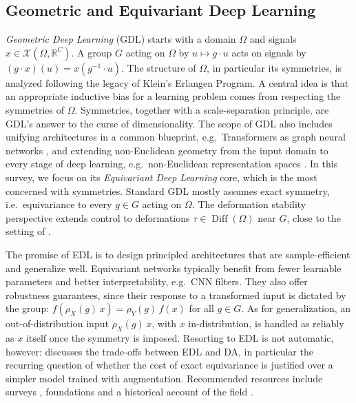 \documentclass[mathematics,review,submit,moreauthors]{Definitions/mdpi}
\begin{document}
\subsection{Geometric and Equivariant Deep Learning}\label{sec:gdl}
\emph{Geometric Deep Learning} (GDL) \citep{bronstein2017ispm,bronstein2021} starts with a domain $\Omega$ and signals $x\in\mathcal{X}(\Omega,\mathbb{R}^C)$. A group $G$ acting on $\Omega$ by $u\mapsto g\cdot u$ acts on signals by $(g\cdot x)(u)=x(g^{-1}\cdot u)$.
The structure of $\Omega$, in particular its symmetries, is analyzed following the legacy of Klein's Erlangen Program.
A central idea is that an appropriate inductive bias for a learning problem comes from respecting the symmetries of $\Omega$.
Symmetries, together with a scale-separation principle, are GDL's answer to the curse of dimensionality.
The scope of GDL also includes unifying architectures in a common blueprint, e.g.\ Transformers as graph neural networks \citep{joshi2025}, and extending non-Euclidean geometry from the input domain to every stage of deep learning, e.g.\ non-Euclidean representation spaces \citep{mettes2024ijcv,saezdeocarizborde2025iclr}.
In this survey, we focus on its \emph{Equivariant Deep Learning} core, which is the most concerned with symmetries.
Standard GDL mostly assumes exact symmetry, i.e.\ equivariance to every $g\in G$ acting on $\Omega$.
The deformation stability perspective \citep[Sec.~3.3]{bronstein2021} extends control to deformations $\tau\in\operatorname{Diff}(\Omega)$ near $G$, close to the setting of .

The promise of EDL is to design principled architectures that are sample-efficient and generalize well.
Equivariant networks typically benefit from fewer learnable parameters and better interpretability, e.g.\ CNN filters.
They also offer robustness guarantees, since their response to a transformed input is dictated by the group: $f(\rho_X(g)\,x)=\rho_Y(g)\,f(x)$ for all $g\in G$.
As for generalization, an out-of-distribution input $\rho_X(g)\,x$, with $x$ in-distribution, is handled as reliably as $x$ itself once the symmetry is imposed.
Resorting to EDL is not automatic, however:  discusses the trade-offs between EDL and DA, in particular the recurring question of whether the cost of exact equivariance is justified over a simpler model trained with augmentation.
Recommended resources include surveys \citep{rath2024air,basheer2025ijdsa}, foundations \citep{borde2025,gerken2021,carlsson2025} and a historical account of the field \citep{bronstein2023tg}.
\end{document}
